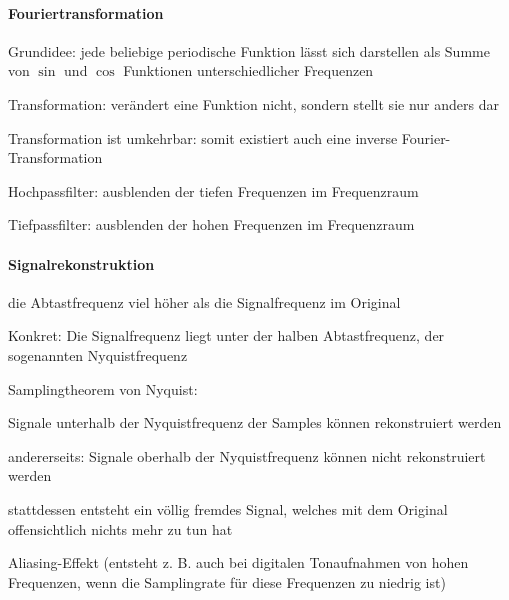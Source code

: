 \documentclass[landscape]{article}
\begin{document}
\begin{multicols}{3}
  
  \paragraph{Fouriertransformation}
  \begin{itemize*}
    \item Grundidee: jede beliebige periodische Funktion lässt sich darstellen als Summe von $\sin$ und $\cos$ Funktionen unterschiedlicher Frequenzen
    \item Transformation: verändert eine Funktion nicht, sondern stellt sie nur anders dar
    \item Transformation ist umkehrbar: somit existiert auch eine inverse Fourier-Transformation
    \item Hochpassfilter: ausblenden der tiefen Frequenzen im Frequenzraum
    \item Tiefpassfilter: ausblenden der hohen Frequenzen im Frequenzraum
  \end{itemize*}
  
  
  \paragraph{Signalrekonstruktion}
  \begin{itemize*}
    \item die Abtastfrequenz viel höher als die Signalfrequenz im Original
    \item Konkret: Die Signalfrequenz liegt unter der halben Abtastfrequenz, der sogenannten Nyquistfrequenz
    \item Samplingtheorem von Nyquist:
    \begin{itemize*}
      \item Signale unterhalb der Nyquistfrequenz der Samples können rekonstruiert werden
      \item andererseits: Signale oberhalb der Nyquistfrequenz können nicht rekonstruiert werden
      \item stattdessen entsteht ein völlig fremdes Signal, welches mit dem Original offensichtlich nichts mehr zu tun hat
      \item Aliasing-Effekt (entsteht z. B. auch bei digitalen Tonaufnahmen von hohen Frequenzen, wenn die Samplingrate für diese Frequenzen zu niedrig ist)
    \end{itemize*}
  \end{itemize*}
  

\end{multicols}
\end{document}
